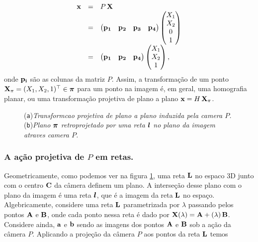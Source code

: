 \begin{equation*}
\begin{array}{rcl}
\mathbf{x}&=&P\,\mathbf{X}\\
&=&
\begin{pmatrix}
{\bf p_1}&{\bf p_2}&{\bf p_3}&{\bf p_4}
\end{pmatrix}
\begin{pmatrix}
X_1\\
X_2\\
0\\
1
\end{pmatrix}\\
&=&
\begin{pmatrix}
{\bf p_1}&{\bf p_2}&{\bf p_4}
\end{pmatrix}
\begin{pmatrix}
X_1\\
X_2\\
1
\end{pmatrix},
\end{array}
\end{equation*}
onde ${\bf p_i}$ são as colunas da matriz $P$. Assim, a transformação de um ponto $\mathbf{X}_\pi=(X_1,X_2,1)^\top\in\boldsymbol{\pi}$ para um ponto na imagem é, em geral, uma homografia planar, ou uma transformação projetiva de plano a plano $\mathbf{x}=H\,\mathbf{X}_\pi$.


\begin{figure}[htb!]
\centering
{}
\quad
{}
\caption{({\tt a})\textit{Transformcao projetiva de plano a plano induzida pela camera $P$.}\,\,({\tt b})\textit{Plano $\boldsymbol{\pi}$ retroprojetado por uma reta $\boldsymbol{l}$ no plano da imagem atraves camera $P$.}}
\label{fig.projecao-planos-retas}
\end{figure}

\subsubsection{A ação projetiva de $P$ em retas.}\label{sec.proj.retas}
Geometricamente, como podemos ver na figura \ref{fig.projecao-planos-retas}, uma reta ${\bf L}$ no espaco 3D junto com o centro ${\bf C}$ da câmera definem um plano. A interseção desse plano com o plano da imagem é uma reta $\boldsymbol{l}$, que é a imagem da reta ${\bf L}$ no espaço. Algebricamente, considere uma reta ${\bf L}$ parametrizada por $\lambda$ passando pelos pontos ${\bf A}$ e ${\bf B}$, onde cada ponto nessa reta é dado por $\mathbf{X}(\lambda)={\bf A}+(\lambda)\,{\bf B}$. Considere ainda, ${\bf a}$ e ${\bf b}$ sendo as imagens dos pontos ${\bf A}$ e ${\bf B}$ sob a ação da câmera $P$. Aplicando a projeção da câmera $P$ aos pontos da reta ${\bf L}$ temos

